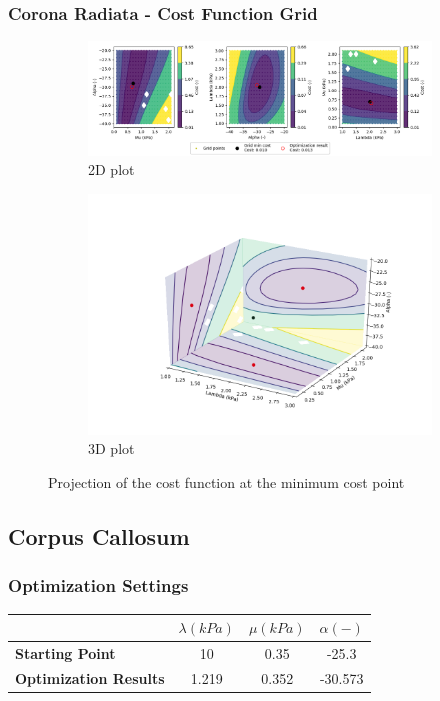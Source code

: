 \documentclass{beamer}
\begin{document}
\begin{frame}
\frametitle{Corona Radiata - Cost Function Grid}
\begin{figure}[h!]
\centering
\begin{subfigure}[t]{0.6\linewidth}
\centering
\includegraphics[width = 1.\linewidth, trim = 80 00 50 00]
{Pictures/CoronaRadiataMinPointProjection}
\caption{2D plot}
\end{subfigure}%
\begin{subfigure}[t]{0.4\linewidth}
\centering
\includegraphics[width = 1.\textwidth, trim = 50 50 80 50]
{Pictures/CoronaRadiataMinPointProjection3D}
\caption{3D plot}
\end{subfigure}
\caption{Projection of the cost function at the minimum cost point}
\end{figure}
\end{frame}

\subsection{Corpus Callosum}
\begin{frame}
\frametitle{Optimization Settings}
	\begin{table}[h!]
	\centering
		\begin{tabular}{lccc}
		\toprule
		& \textbf{$\lambda (kPa)$} & \textbf{$\mu (kPa)$} & \textbf{$\alpha (-)$}\\
		\midrule
		\textbf{Starting Point} & 10 & 0.35 & -25.3 \\
		\textbf{Optimization Results} & 1.219& 0.352 & -30.573 \\
		\bottomrule
		\end{tabular}
	\end{table}
\end{frame}
\end{document}
